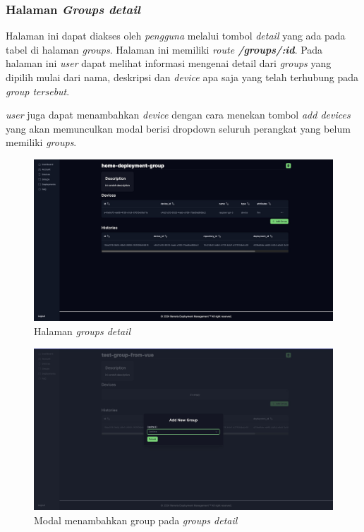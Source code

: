 \pagebreak

\subsubsection{Halaman \textit{Groups detail}}
Halaman ini dapat diakses oleh \textit{pengguna} melalui tombol \textit{detail} yang ada pada tabel di halaman \textit{groups}. Halaman ini memiliki \textit{route \textbf{/groups/:id}}. Pada halaman ini \textit{user} dapat melihat informasi mengenai detail dari \textit{groups} yang dipilih mulai dari nama, deskripsi dan \textit{device} apa saja yang telah terhubung pada \textit{group tersebut}.

\textit{user} juga dapat menambahkan \textit{device} dengan cara menekan tombol \textit{add devices} yang akan memunculkan modal berisi dropdown seluruh perangkat yang belum memiliki \textit{groups}.

\begin{figure}[h]
  \centering
  \includegraphics[width=1\textwidth]{resources/chapter-4/dashboard/groups-detail-page.jpg}
  \caption{Halaman \textit{groups detail}}
  \label{fig:halaman-groups-detail}
\end{figure}

\begin{figure}[h]
  \centering
  \includegraphics[width=1\textwidth]{resources/chapter-4/dashboard/groups-detail-add-device.jpg}
  \caption{Modal menambahkan group pada \textit{groups detail}}
  \label{fig:halaman-groups-detail-add-group}
\end{figure}

